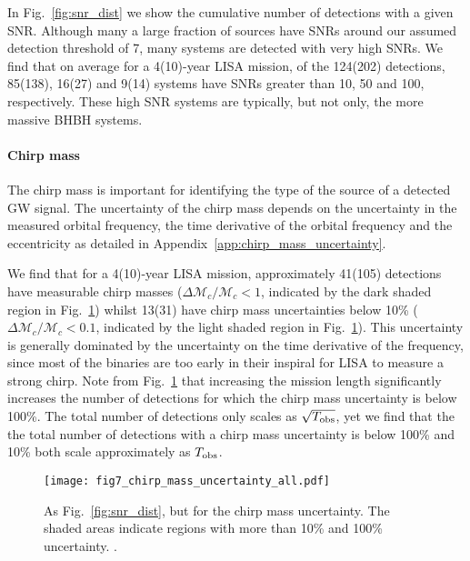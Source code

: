 In Fig.~\ref{fig:snr_dist} we show the cumulative number of detections with a given SNR. Although many a large fraction of sources have SNRs around our assumed detection threshold of 7, many systems are detected with very high SNRs. We find that on average for a 4(10)-year LISA mission, of the 124(202) detections, 85(138), 16(27) and 9(14) systems have SNRs greater than 10, 50 and 100, respectively. These high SNR systems are typically, but not only, the more massive BHBH systems.

\paragraph{Chirp mass}

The chirp mass is important for identifying the type of the source of a detected GW signal. The uncertainty of the chirp mass depends on the uncertainty in the measured orbital frequency, the time derivative of the orbital frequency and the eccentricity as detailed in Appendix~\ref{app:chirp_mass_uncertainty}.

We find that for a 4(10)-year LISA mission, approximately 41(105) detections have measurable chirp masses ($\Delta \mathcal{M}_c / \mathcal{M}_c < 1$, indicated by the dark shaded region in Fig.~\ref{fig:m_c_unc}) whilst 13(31) have chirp mass uncertainties below 10\% ($\Delta \mathcal{M}_c / \mathcal{M}_c < 0.1$, indicated by the light shaded region in Fig.~\ref{fig:m_c_unc}). This uncertainty is generally dominated by the uncertainty on the time derivative of the frequency, since most of the binaries are too early in their inspiral for LISA to measure a strong chirp.
%
Note from Fig.~\ref{fig:m_c_unc} that increasing the mission length significantly increases the number of detections for which the chirp mass uncertainty is below 100\%. The total number of detections only scales as $\sqrt{T_{\rm obs}}$, yet we find that the the total number of detections with a chirp mass uncertainty is below 100\% and 10\% both scale approximately as $T_{\rm obs}$.

\begin{figure}[tb]
    \centering
    \texttt{[image: fig7\_chirp\_mass\_uncertainty\_all.pdf]}
    \caption{As Fig.~\ref{fig:snr_dist}, but for the chirp mass uncertainty. The shaded areas indicate regions with more than 10\% and 100\% uncertainty. \href{https://github.com/TomWagg/detecting-DCOs-in-LISA/blob/main/paper/figures/fig7_chirp_mass_uncertainty_all.pdf}{\faFileImage} \href{https://github.com/TomWagg/detecting-DCOs-in-LISA/blob/main/paper/figure_notebooks/fiducial.ipynb}{\faBook}.}
    \label{fig:m_c_unc}
\end{figure}

